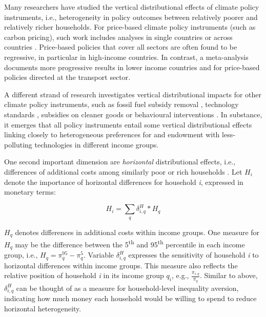 \documentclass[12pt, a4paper]{article}
\begin{document}
Many researchers have studied the vertical distributional effects of climate policy instruments, i.e., heterogeneity in policy outcomes between relatively poorer and relatively richer households. For price-based climate policy instruments (such as carbon pricing), such work includes analyses in single countries \autocite{Poterba.1991,Goulder.2019,Grainger.2010,Rausch.2011,Garaffa.2021,Sterner.2012,Wu.2022} or across countries \autocite{Budolfson.2021,Feindt.2021,Dorband.2019,Steckel.2021b,VogtSchilb.2019,Missbach.2024}. Price-based policies that cover all sectors are often found to be regressive, in particular in high-income countries. In contrast, a meta-analysis \autocite{Ohlendorf.2021} documents more progressive results in lower income countries and for price-based policies directed at the transport sector.

A different strand of research investigates vertical distributional impacts for other climate policy instruments, such as fossil fuel subsidy removal \autocite{Schaffitzel.2019,Giuliano.2020,DelArzeGranado.2012}, technology standards \autocite{Levinson.2019,Zhao.2022,Bruegge.2019}, subsidies on cleaner goods \autocite{Borenstein.2016,Vaishnav.2017,Winter.2019} or behavioural interventions \autocite{DellaValle.2020,Liebe.2021}. In substance, it emerges that all policy instruments entail some vertical distributional effects linking closely to heterogeneous preferences for and endowment with less-polluting technologies in different income groups. 

One second important dimension are \textit{horizontal} distributional effects, i.e., differences of additional costs among similarly poor or rich households \autocite{Rausch.2011,Fischer.2019}. Let $H_{i}$ denote the importance of horizontal differences for household \textit{i}, expressed in monetary terms:

\begin{equation}\label{eq_H}
    H_{i} = \sum_{q} \delta_{i,q}^{H} * H_{q}
\end{equation}

$H_{q}$ denotes differences in additional costs within income groups. One measure for $H_{q}$ may be the difference between the 5\textsuperscript{th} and 95\textsuperscript{th} percentile in each income group, i.e., $H_{q}=\pi_{q}^{95}-\pi_{q}^{5}$. Variable $\delta_{i,q}^{H}$ expresses the sensitivity of household \textit{i} to horizontal differences within income groups. This measure also reflects the relative position of household \textit{i} in its income group $q_{i}$, e.g., $\frac{\pi_{i,q}}{\overline{\pi_{q}}}$. Similar to above, $\delta_{i,q}^{H}$ can be thought of as a measure for household-level inequality aversion, indicating how much money each household would be willing to spend to reduce horizontal heterogeneity.
\end{document}
